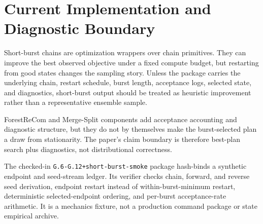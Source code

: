 \section{Current Implementation and Diagnostic Boundary}

Short-burst chains are optimization wrappers over chain primitives.  They can
improve the best observed objective under a fixed compute budget, but restarting
from good states changes the sampling story.  Unless the package carries the
underlying chain, restart schedule, burst length, acceptance logs, selected
state, and diagnostics, short-burst output should be treated as heuristic
improvement rather than a representative ensemble sample.

ForestReCom and Merge-Split components add acceptance accounting and diagnostic
structure, but they do not by themselves make the burst-selected plan a draw
from stationarity.  The paper's claim boundary is therefore best-plan search
plus diagnostics, not distributional correctness.

The checked-in \texttt{G.6-G.12+short-burst-smoke} package hash-binds a
synthetic endpoint and seed-stream ledger.  Its verifier checks chain, forward,
and reverse seed derivation, endpoint restart instead of within-burst-minimum
restart, deterministic selected-endpoint ordering, and per-burst acceptance-rate
arithmetic.  It is a mechanics fixture, not a production command package or
state empirical archive.
